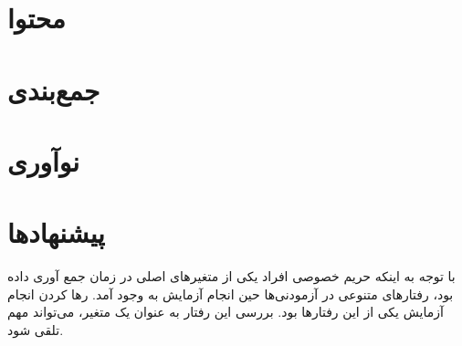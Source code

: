 \section{محتوا}

\section{جمع‌بندی}

\section{نوآوری}

\section{پیشنهادها}
 با  توجه به اینکه  حریم خصوصی افراد یکی از متغیر‌های اصلی در زمان جمع آوری داده بود، رفتار‌های متنوعی در آزمودنی‌ها حین انجام آزمایش به وجود آمد. رها کردن انجام آزمایش یکی از این رفتار‌ها بود. بررسی این رفتار به عنوان یک متغیر، می‌تواند مهم تلقی شود.

